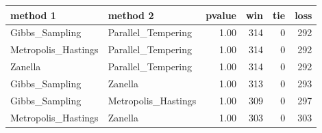 \begin{table}[ht]
\centering
\begin{tabular}{llrrrr}
  \hline
method 1 & method 2 & pvalue & win & tie & loss \\ 
  \hline
Gibbs\_Sampling & Parallel\_Tempering & 1.00 & 314 &   0 & 292 \\ 
  Metropolis\_Hastings & Parallel\_Tempering & 1.00 & 314 &   0 & 292 \\ 
  Zanella & Parallel\_Tempering & 1.00 & 314 &   0 & 292 \\ 
  Gibbs\_Sampling & Zanella & 1.00 & 313 &   0 & 293 \\ 
  Gibbs\_Sampling & Metropolis\_Hastings & 1.00 & 309 &   0 & 297 \\ 
  Metropolis\_Hastings & Zanella & 1.00 & 303 &   0 & 303 \\ 
   \hline
\end{tabular}
\end{table}
